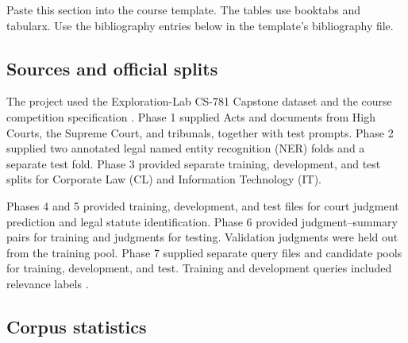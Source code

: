Paste this section into the course template. The tables use booktabs and tabularx. Use the bibliography entries below in the template's bibliography file.

\subsection{Sources and official splits}\label{sources-and-official-splits}

The project used the Exploration-Lab CS-781 Capstone dataset and the
course competition specification \cite{cs781_dataset, cs781_brief}.
Phase 1 supplied Acts and documents from High Courts, the Supreme Court,
and tribunals, together with test prompts. Phase 2 supplied two
annotated legal named entity recognition (NER) folds and a separate test
fold. Phase 3 provided separate training, development, and test splits
for Corporate Law (CL) and Information Technology (IT).

Phases 4 and 5 provided training, development, and test files for court
judgment prediction and legal statute identification. Phase 6 provided
judgment--summary pairs for training and judgments for testing.
Validation judgments were held out from the training pool. Phase 7
supplied separate query files and candidate pools for training,
development, and test. Training and development queries included
relevance labels \cite{cs781_brief}.

\subsection{Corpus statistics}\label{corpus-statistics}

